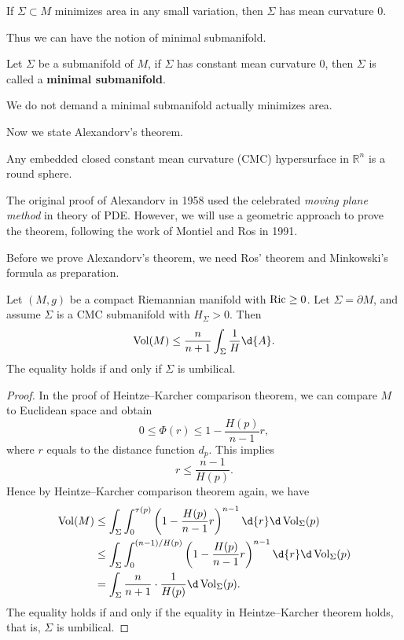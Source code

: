 \begin{cor}
    If $\Sigma\subset M$ minimizes area in any small variation, then $\Sigma$ has mean curvature $0$.
\end{cor}

Thus we can have the notion of minimal submanifold.
\begin{defn}
    Let $\Sigma$ be a submanifold of $M$, if $\Sigma$ has constant mean curvature $0$, then $\Sigma$ is called a \textbf{minimal submanifold}.
\end{defn}

\begin{rem}
    We do not demand a minimal submanifold actually minimizes area.
\end{rem}

Now we state Alexandorv's theorem.
\begin{thm}[Alexandorv]
    Any embedded closed constant mean curvature (CMC) hypersurface in $\mathbb{R}^n$ is a round sphere.
\end{thm}

\begin{rem}
    The original proof of Alexandorv in 1958 used the celebrated \emph{moving plane method} in theory of PDE.
    However, we will use a geometric approach to prove the theorem, following the work of Montiel and Ros in 1991.
\end{rem}

Before we prove Alexandorv's theorem, we need Ros' theorem and Minkowski's formula as preparation.

\begin{thm}[Ros]
    Let $(M,g)$ be a compact Riemannian manifold with $\operatorname{Ric}\geq 0$.
    Let $\Sigma=\partial M$, and assume $\Sigma$ is a CMC submanifold with $H_\Sigma>0$.
    Then
    \[\Vol(M)\leq\frac{n}{n+1}\int_\Sigma\frac{1}{H}\d{A}.\]
    The equality holds if and only if $\Sigma$ is umbilical.
\end{thm}
\begin{proof}
    In the proof of Heintze--Karcher comparison theorem, we can compare $M$ to Euclidean space and obtain
    \[0\leq\Phi(r)\leq 1-\frac{H(p)}{n-1}r,\]
    where $r$ equals to the distance function $d_p$.
    This implies
    \[r\leq\frac{n-1}{H(p)}.\]
    Hence by Heintze--Karcher comparison theorem again, we have
    \begin{align*}
        \Vol(M)&\leq\int_\Sigma\int_0^{\tau(p)}\left(1-\frac{H(p)}{n-1}r\right)^{n-1}\d{r}\d\Vol_{\Sigma}(p)\\
        &\leq\int_\Sigma\int_{0}^{(n-1)/H(p)}\left(1-\frac{H(p)}{n-1}r\right)^{n-1}\d{r}\d\Vol_{\Sigma}(p)\\
        &=\int_\Sigma\frac{n}{n+1}\cdot\frac{1}{H(p)}\d\Vol_\Sigma(p).
    \end{align*}
    The equality holds if and only if the equality in Heintze--Karcher theorem holds, that is, $\Sigma$ is umbilical. 
\end{proof}

